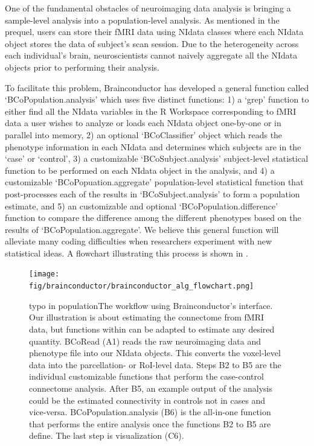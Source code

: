 \documentclass{nature}
\begin{document}
One of the fundamental obstacles of neuroimaging data analysis is bringing a
sample-level
analysis into a population-level analysis. As mentioned in the prequel, users
can
store their fMRI data using NIdata classes where each NIdata object stores the
data of
subject's scan session. Due to the heterogeneity across each individual's brain,
neuroscientists cannot naively aggregate all the NIdata objects prior to
performing their
analysis.

To facilitate this problem, Brainconductor has developed a general function
called
`BCoPopulation.analysis' which uses five distinct functions: 1) a `grep'
function to either
find all the NIdata variables in the R Workspace corresponding to fMRI data a
user wishes
to analyze or loads each NIdata object one-by-one or in parallel into memory,
2) an optional `BCoClassifier' object which reads the phenotype information
in each NIdata and determines which subjects are in the `case' or `control', 3)
a customizable `BCoSubject.analysis' subject-level statistical function to be
performed on each NIdata object in the
analysis, and 4) a customizable `BCoPopuation.aggregate' population-level
statistical function
that post-processes each of the results in `BCoSubject.analysis' to form a
population
estimate, and 5) an customizable and optional `BCoPopulation.difference'
function
to compare the difference among the different phenotypes based on the
results of `BCoPopulation.aggregate'. We believe this general
function will alleviate many coding difficulties when researchers experiment
with
new statistical ideas. A flowchart illustrating this process is shown in
.

\begin{figure}[tb]
\centering
\texttt{[image: fig/brainconductor/brainconductor\_alg\_flowchart.png]}
\caption{{\color{red}typo in population}The workflow using Brainconductor's interface. Our illustration
is about estimating the connectome from fMRI data, but functions within can be
adapted to estimate any desired quantity. BCoRead (A1) reads the
raw neuroimaging
data and phenotype file into our NIdata objects. This
converts the voxel-level data into the parcellation- or RoI-level
data. Steps B2 to B5 are the individual
customizable functions that perform the case-control connectome analysis.
After B5, an example output of the analysis could be
the estimated connectivity in controls not in cases and vice-versa.
 BCoPopulation.analysis (B6) is the all-in-one function that performs the entire
analysis
once the functions B2 to B5 are define. The last step is visualization (C6).}
\label{fig:flowchart}
\end{figure}
\end{document}
